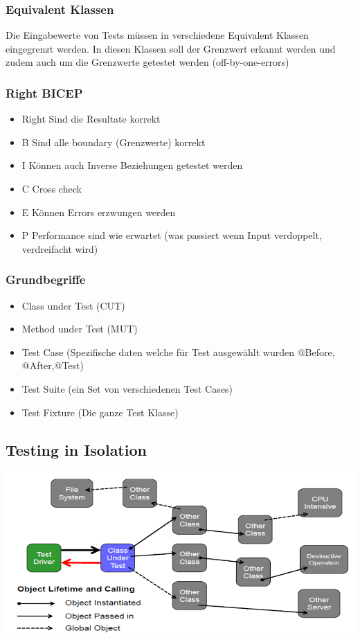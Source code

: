 \documentclass[10pt]{article}
\begin{document}
    \subsubsection{Equivalent Klassen}
    Die Eingabewerte von Tests m\"ussen in verschiedene Equivalent Klassen eingegrenzt werden. In diesen Klassen soll der Grenzwert erkannt werden und zudem auch um die Grenzwerte getestet werden (off-by-one-errors)
    \subsubsection{Right BICEP}
    \begin{itemize}
        \item Right \textendash Sind die Resultate korrekt
        \item B \textendash Sind alle boundary (Grenzwerte) korrekt
        \item I \textendash K\"onnen auch Inverse Beziehungen getestet werden
        \item C \textendash Cross check
        \item E \textendash K\"onnen Errors erzwungen werden
        \item P \textendash Performance sind wie erwartet (was passiert wenn Input verdoppelt, verdreifacht wird)
    \end{itemize}

    \subsubsection{Grundbegriffe}
    \begin{itemize}
        \item Class under Test (CUT)
        \item Method under Test (MUT)
        \item Test Case (Spezifische daten welche f\"ur Test ausgew\"ahlt wurden @Before, @After,@Test)
        \item Test Suite (ein Set von verschiedenen Test Cases)
        \item Test Fixture (Die ganze Test Klasse)
    \end{itemize}

    \subsection{Testing in Isolation}
    \includegraphics{assets/isolation_testing.png}
   
\end{document}
